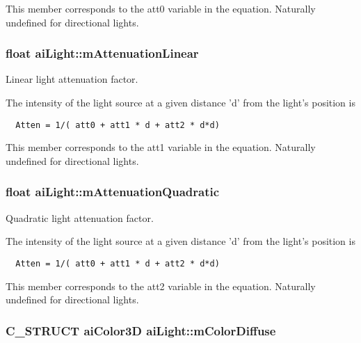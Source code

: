  This member corresponds to the att0 variable in the equation. Naturally undefined for directional lights. \hypertarget{structai_light_efda311eaa785ea345782dfa95be817c}{
\subsubsection[mAttenuationLinear]{\setlength{\rightskip}{0pt plus 5cm}float {\bf aiLight::mAttenuationLinear}}}
\label{structai_light_efda311eaa785ea345782dfa95be817c}


Linear light attenuation factor.

The intensity of the light source at a given distance 'd' from the light's position is 

\begin{Code}\begin{verbatim}  Atten = 1/( att0 + att1 * d + att2 * d*d)
\end{verbatim}
\end{Code}

 This member corresponds to the att1 variable in the equation. Naturally undefined for directional lights. \hypertarget{structai_light_b4fb07bfa40a807661b1ed1791838a6d}{
\subsubsection[mAttenuationQuadratic]{\setlength{\rightskip}{0pt plus 5cm}float {\bf aiLight::mAttenuationQuadratic}}}
\label{structai_light_b4fb07bfa40a807661b1ed1791838a6d}


Quadratic light attenuation factor.

The intensity of the light source at a given distance 'd' from the light's position is 

\begin{Code}\begin{verbatim}  Atten = 1/( att0 + att1 * d + att2 * d*d)
\end{verbatim}
\end{Code}

 This member corresponds to the att2 variable in the equation. Naturally undefined for directional lights. \hypertarget{structai_light_22e7feebbfaf53adf73bd9f581636efd}{
\subsubsection[mColorDiffuse]{\setlength{\rightskip}{0pt plus 5cm}C\_\-STRUCT {\bf aiColor3D} {\bf aiLight::mColorDiffuse}}}
\label{structai_light_22e7feebbfaf53adf73bd9f581636efd}


